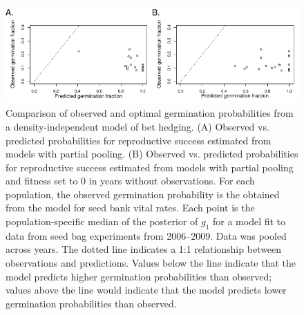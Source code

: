 \documentclass[12pt, oneside, titlepage]{article}   	%
\begin{document}
 
  \begin{figure}[h]
   \centering
       \includegraphics[page=1,width=.9\textwidth]{../manuscript/figures/analysis-figure-2.pdf}  
    \caption{ Comparison of observed and optimal germination probabilities from a density-independent model of bet hedging. (A) Observed vs. predicted probabilities for reproductive success estimated from models with partial pooling. (B) Observed vs. predicted probabilities for reproductive success estimated from models with partial pooling and fitness set to 0 in years without observations. For each population, the observed germination probability is the obtained from the model for seed bank vital rates. Each point is the population-specific median of the posterior of $g_1$ for a model fit to data from seed bag experiments from 2006--2009. Data was pooled across years. The dotted line indicates a 1:1 relationship between observations and predictions. Values below the line indicate that the model predicts higher germination probabilities than observed; values above the line would indicate that the model predicts lower germination probabilities than observed. }
 \label{fig:obs-pred-lowFitness}
\end{figure}
\end{document}
